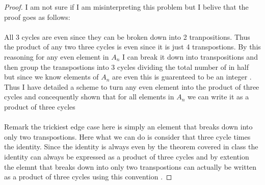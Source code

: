 \documentclass[11pt]{article}
\theoremstyle{definition}  %
\begin{document}
\begin{proof}
I am not sure if I am misinterpreting this problem but I belive that the proof goes as follows: \\\\
All 3 cycles are even since they can be broken down into 2 tranpositions. Thus the product of any two three cycles is even since it is just 4 transpostions. By this reasoning for any even element in $A_n$ I can break it down into transpositions and then group the transpostions into 3 cycles dividing the total number of in half but since we know elements of $A_n$ are even this is guarenteed to be an integer . Thus I have detailed a scheme to turn any even element into the product of three cycles and concequently shown that for all elements in $A_n$ we can write it as a product of three cycles\\\\
Remark the trickiest edge case here is simply an element that breaks down into only two transpostions. Here what we can do is consider that three cycle times the identity. Since the identity is always even by the theorem covered in class the identity can always be expressed as a product of three cycles and by extention the elemnt that breaks down into only two transpostions can actually be written as a product of three cycles using this convention .
\end{proof}
\end{document}
